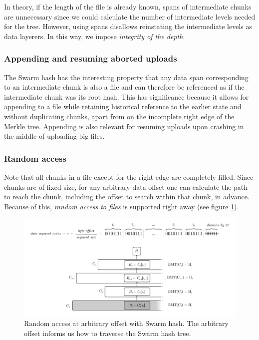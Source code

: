 In theory, if the length of the file is already known, spans of intermediate chunks are unnecessary since we could calculate the number of intermediate levels needed for the tree. However, using spans disallows reinstating the intermediate levels as data layerers. In this way, we impose \emph{integrity of the depth}. 

\subsubsection{Appending and resuming aborted uploads}

The Swarm hash has the interesting property that any data span corresponding to an intermediate chunk is also a file and can therefore be referenced as if the intermediate chunk was its root hash. This has significance because it allows for appending to a file while retaining historical reference to the earlier state and without duplicating chunks, apart from on the incomplete right edge of the Merkle tree. Appending is also relevant for resuming uploads upon crashing in the middle of uploading big files.

\subsubsection{Random access}

Note that all chunks in a file except for the right edge are completely filled. Since chunks are of fixed size, for any arbitrary data offset one can calculate  the path to reach the chunk, including the offset to search within that chunk, in advance. Because of this, \emph{random access to files} is supported right away (see figure \ref{fig:random-access}).


\begin{figure}[htbp]
\centering
\includegraphics[width=\textwidth]{fig/random-access.pdf}
\caption[Random access at arbitrary offset with Swarm hash \statusgreen]{Random access at arbitrary offset with Swarm hash. The arbitrary offset informs us how to traverse the Swarm hash tree.}
\label{fig:random-access}
\end{figure}

